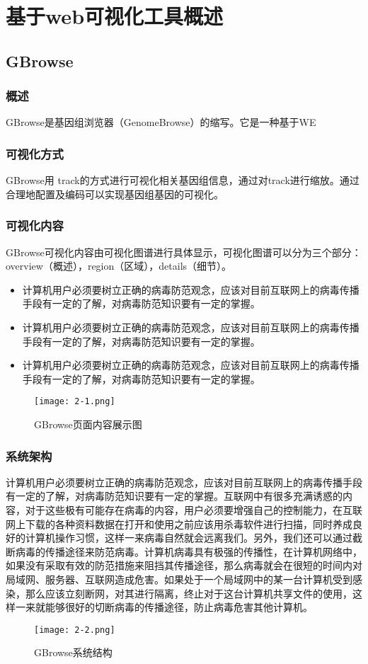 \chapter{基于web可视化工具概述}
	\section{GBrowse}
		\subsection{概述}
		GBrowse是基因组浏览器（GenomeBrowse）的缩写。它是一种基于WE
		\subsection{可视化方式}
		GBrowse用 track的方式进行可视化相关基因组信息，通过对track进行缩放。通过合理地配置及编码可以实现基因组基因的可视化。
	
		\subsection{可视化内容}
		GBrowse可视化内容由可视化图谱进行具体显示，可视化图谱可以分为三个部分：overview（概述），region（区域），details（细节）。
		\begin{itemize}
			\item 计算机用户必须要树立正确的病毒防范观念，应该对目前互联网上的病毒传播手段有一定的了解，对病毒防范知识要有一定的掌握。
			\item 计算机用户必须要树立正确的病毒防范观念，应该对目前互联网上的病毒传播手段有一定的了解，对病毒防范知识要有一定的掌握。
			\item 计算机用户必须要树立正确的病毒防范观念，应该对目前互联网上的病毒传播手段有一定的了解，对病毒防范知识要有一定的掌握。
		\end{itemize}

		\begin{figure}
			\centering
			\texttt{[image: 2-1.png]}
			\caption{GBrowse页面内容展示图}
		\end{figure}	
		\subsection{系统架构}
			计算机用户必须要树立正确的病毒防范观念，应该对目前互联网上的病毒传播手段有一定的了解，对病毒防范知识要有一定的掌握。互联网中有很多充满诱惑的内容，对于这些极有可能存在病毒的内容，用户必须要增强自己的控制能力，在互联网上下载的各种资料数据在打开和使用之前应该用杀毒软件进行扫描，同时养成良好的计算机操作习惯，这样一来病毒自然就会远离我们。另外，我们还可以通过截断病毒的传播途径来防范病毒。计算机病毒具有极强的传播性，在计算机网络中，如果没有采取有效的防范措施来阻挡其传播途径，那么病毒就会在很短的时间内对局域网、服务器、互联网造成危害。如果处于一个局域网中的某一台计算机受到感染，那么应该立刻断网，对其进行隔离，终止对于这台计算机共享文件的使用，这样一来就能够很好的切断病毒的传播途径，防止病毒危害其他计算机。
		\begin{figure}[!ht]
			\centering
			\texttt{[image: 2-2.png]}
			\caption{GBrowse系统结构}
		\end{figure}
